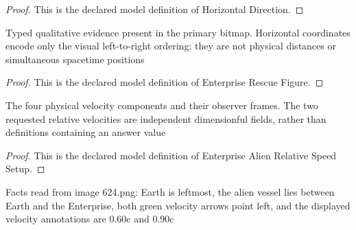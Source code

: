 \begin{proof}
  This is the declared model definition of Horizontal Direction.
\end{proof}
\begin{definition}
  \label{def:physics:phyx-mini-0624:phyxminiproblems-problemphyxmini0624-enterpriserescuefigure}
  Typed qualitative evidence present in the primary bitmap. Horizontal coordinates encode only the visual left-to-right ordering; they are not physical distances or simultaneous spacetime positions
\end{definition}
\begin{proof}
  This is the declared model definition of Enterprise Rescue Figure.
\end{proof}
\begin{definition}
  \label{def:physics:phyx-mini-0624:phyxminiproblems-problemphyxmini0624-enterprisealienrelativespeedsetup}
  The four physical velocity components and their observer frames. The two requested relative velocities are independent dimensionful fields, rather than definitions containing an answer value
\end{definition}
\begin{proof}
  This is the declared model definition of Enterprise Alien Relative Speed Setup.
\end{proof}
\begin{definition}
  \label{def:physics:phyx-mini-0624:phyxminiproblems-problemphyxmini0624-matchesprimaryfigure}
  Facts read from image 624.png: Earth is leftmost, the alien vessel lies between Earth and the Enterprise, both green velocity arrows point left, and the displayed velocity annotations are 0.60c and 0.90c
\end{definition}
